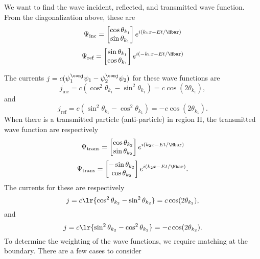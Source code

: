 We want to find the wave incident, reflected, and transmitted wave function.  From the diagonalization above, these are
%
\begin{dmath}\label{eqn:gradQuantumProblemSet4Problem3:640}
\Psi_{\textrm{inc}} =
\begin{bmatrix}
\cos\theta_{k_1} \\
\sin\theta_{k_1} \\
\end{bmatrix}
e^{i (k_1 x - E t/\Hbar)}
\end{dmath}
\begin{dmath}\label{eqn:gradQuantumProblemSet4Problem3:660}
\Psi_{\textrm{ref}} =
\begin{bmatrix}
\sin\theta_{k_1} \\
\cos\theta_{k_1} \\
\end{bmatrix}
e^{i (-k_1 x - E t/\Hbar)}
\end{dmath}

The currents \( j = c (\psi_1^\conj \psi_1 - \psi_2^\conj \psi_2) \) for these wave functions are
%
\begin{equation}\label{eqn:gradQuantumProblemSet4Problem3:960}
j_{\textrm{inc}} = c (\cos^2 \theta_{k_1} - \sin^2 \theta_{k_1}) = c \cos(2 \theta_{k_1} ),
\end{equation}
%
and
%
\begin{equation}\label{eqn:gradQuantumProblemSet4Problem3:980}
j_{\textrm{ref}} = c (\sin^2 \theta_{k_1} - \cos^2 \theta_{k_1}) = -c \cos(2 \theta_{k_1} ).
\end{equation}
%
When there is a transmitted particle (anti-particle) in region II, the transmitted wave function are respectively
%
\begin{dmath}\label{eqn:gradQuantumProblemSet4Problem3:680}
\Psi_{\textrm{trans}} =
\begin{bmatrix}
\cos\theta_{k_2} \\
\sin\theta_{k_2} \\
\end{bmatrix}
e^{i (k_2 x - E t/\Hbar)}
\end{dmath}
\begin{dmath}\label{eqn:gradQuantumProblemSet4Problem3:700}
\Psi_{\textrm{trans}} =
\begin{bmatrix}
-\sin\theta_{k_2} \\
\cos\theta_{k_2} \\
\end{bmatrix}
e^{i (k_2 x - E t/\Hbar)}.
\end{dmath}
%
The currents for these are respectively
\begin{dmath}\label{eqn:gradQuantumProblemSet4Problem3:1321}
j = c \lr{ \cos^2\theta_{k_2} - \sin^2\theta_{k_2} } = c \cos(2\theta_{k_2}),
\end{dmath}
%
and
%
\begin{dmath}\label{eqn:gradQuantumProblemSet4Problem3:1341}
j = c \lr{ \sin^2\theta_{k_2} - \cos^2\theta_{k_2} } = -c \cos(2\theta_{k_2}).
\end{dmath}
%
To determine the weighting of the wave functions, we require matching at the boundary.  There are a few cases to consider

